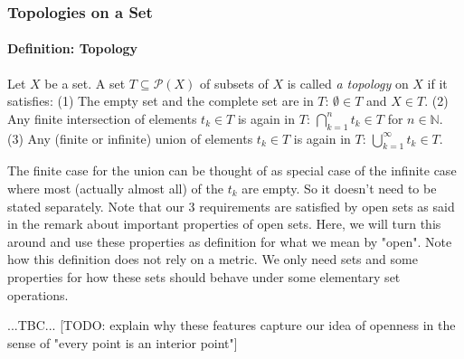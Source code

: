 \subsubsection{Topologies on a Set}

\paragraph{Definition: Topology} 
Let $X$ be a set. A set $T \subseteq \mathcal{P}(X)$ of subsets of $X$ is called \emph{a topology} on $X$ if it satisfies: (1) The empty set and the complete set are in $T$: $\emptyset \in T$ and $X \in T$. (2) Any finite intersection of elements $t_k \in T$ is again in $T$: $\bigcap_{k=1}^n t_k \in T$ for $n \in \mathbb{N}$. (3) Any (finite or infinite) union of elements $t_k \in T$ is again in $T$: $\bigcup_{k=1}^\infty t_k \in T$. 

\medskip
The finite case for the union can be thought of as special case of the infinite case where most (actually almost all) of the $t_k$ are empty. So it doesn't need to be stated separately. Note that our 3 requirements are satisfied by open sets as said in the remark about important properties of open sets. Here, we will turn this around and use these properties as definition for what we mean by "open". Note how this definition does not rely on a metric. We only need sets and some properties for how these sets should behave under some elementary set operations.

...TBC... [TODO: explain why these features capture our idea of openness in the sense of "every point is an interior point"]






